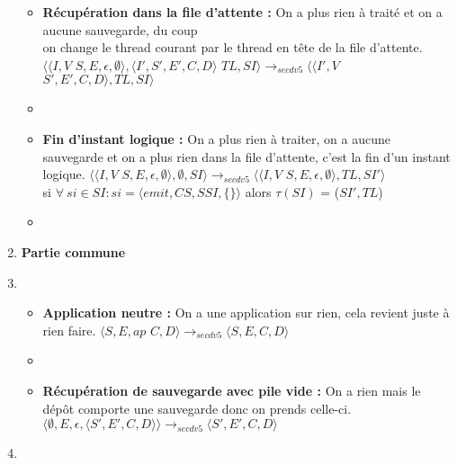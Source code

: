 \documentclass[10pt,a4paper]{article}
\begin{document}
\begin{enumerate}
\begin{itemize}
				\item[] \textbf{Récupération dans la file d'attente :} On a plus rien à traité et on a aucune sauvegarde, du coup 
				\\on change le thread courant par le thread en tête de la file d'attente.
				\smallbreak
				$\langle\langle I,V$ $S,E,\epsilon,\emptyset\rangle,\langle I',S',E',C,D\rangle$ $TL,SI\rangle 
				\longrightarrow_{secdv5} 
				\langle\langle I',V$ $S',E',C,D\rangle,TL,SI\rangle$
				\item[]
				
				\item[] \textbf{Fin d'instant logique :} On a plus rien à traiter, on a aucune sauvegarde et on a plus rien dans la file d'attente, c'est la fin d'un instant logique.
				\smallbreak
				$\langle\langle I,V$ $S,E,\epsilon,\emptyset \rangle ,\emptyset,SI\rangle 
				\longrightarrow_{secdv5} 
				\langle\langle I,V$ $S,E,\epsilon,\emptyset\rangle,TL,SI'\rangle$
				\\si $\forall~si \in SI : si = \langle emit,CS,SSI,\{\}\rangle$ alors $\tau(SI)$ = ($SI',TL$) 
				\item[]
				
			\end{itemize}
			\item[] \textbf{Partie commune} 
			\item[]
			\begin{itemize}
				\item[] \textbf{Application neutre :} On a une application sur rien, cela revient juste à rien faire.
				\smallbreak 
				$\langle S,E,ap$ $C,D\rangle
				\longrightarrow_{secdv5} 
				\langle S,E,C,D\rangle$
				\item[]
				\item[] \textbf{Récupération de sauvegarde avec pile vide :}  On a rien mais le dépôt comporte une sauvegarde donc on prends celle-ci.
				\smallbreak  
				$\langle \emptyset,E,\epsilon,\langle S',E',C,D\rangle\rangle
				\longrightarrow_{secdv5} 
				\langle S',E',C,D\rangle$
			\end{itemize}
			
			\item[]
		\end{enumerate}
		\bigbreak
		\bigbreak
		
\end{document}
